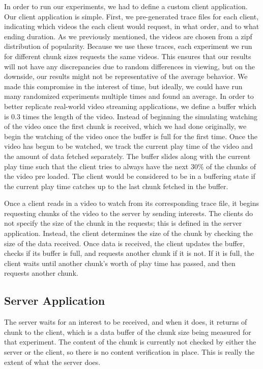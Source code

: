In order to run our experiments, we had to define a custom client application.
Our client application is simple. First, we pre-generated trace files for each
client, indicating which videos the each client would request, in what order,
and to what ending duration. As we previously mentioned, the videos are chosen
from a zipf distribution of popularity. Because we use these traces, each
experiment we run for different chunk sizes requests the same videos. This
ensures that our results will not have any discrepancies due to random
differences in viewing, but on the downside, our results might not be
representative of the average behavior. We made this compromise in the interest
of time, but ideally, we could have run many randomized experiments multiple
times and found an average.
In order to better replicate real-world video streaming applications, we define
a buffer which is 0.3 times the length of the video. Instead of beginning the
simulating watching of the video once the first chunk is received, which we had
done originally, we begin the watching of the video once the buffer is full for
the first time. Once the video has begun to be watched, we track the current
play time of the video and the amount of data fetched separately. The buffer
slides along with the current play time such that the client tries to always
have the next 30\% of the chunks of the video pre loaded. The client would be
considered to be in a buffering state if the current play time catches up to the
last chunk fetched in the buffer.

Once a client reads in a video to watch from its corresponding trace file, it
begins requesting chunks of the video to the server by sending interests. The
clients do not specify the size of the chunk in the requests; this is defined in
the server application. Instead, the client determines the size of the chunk by
checking the size of the data received. Once data is received, the client
updates the buffer, checks if its buffer is full, and requests another chunk if
it is not. If it is full, the client waits until another chunk’s worth of play
time has passed, and then requests another chunk.

\subsection{Server Application} \label{sec:server}

The server waits for an interest to be received, and when it does, it returns of
chunk to the client, which is a data buffer of the chunk size being measured for
that experiment. The content of the chunk is currently not checked by either the
server or the client, so there is no content verification in place. This is
really the extent of what the server does.

